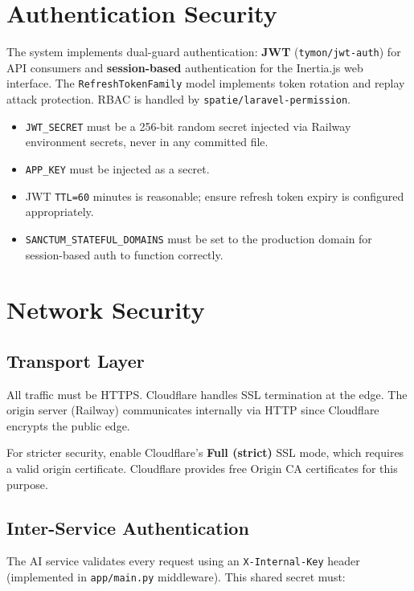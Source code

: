 \documentclass[12pt,a4paper]{report}
\begin{document}
\section{Authentication Security}

The system implements dual-guard authentication:
\textbf{JWT} (\texttt{tymon/jwt-auth}) for API consumers and
\textbf{session-based} authentication for the Inertia.js web
interface. The \texttt{RefreshTokenFamily} model implements token
rotation and replay attack protection. RBAC is handled by
\texttt{spatie/laravel-permission}.

\begin{itemize}[leftmargin=1.5em]
    \item \texttt{JWT\_SECRET} must be a 256-bit random secret injected
          via Railway environment secrets, never in any committed file.
    \item \texttt{APP\_KEY} must be injected as a secret.
    \item JWT \texttt{TTL=60} minutes is reasonable; ensure refresh
          token expiry is configured appropriately.
    \item \texttt{SANCTUM\_STATEFUL\_DOMAINS} must be set to the
          production domain for session-based auth to function correctly.
\end{itemize}

\section{Network Security}

\subsection{Transport Layer}

All traffic must be HTTPS. Cloudflare handles SSL termination at the
edge. The origin server (Railway) communicates internally via HTTP
since Cloudflare encrypts the public edge.

For stricter security, enable Cloudflare's \textbf{Full (strict)} SSL
mode, which requires a valid origin certificate. Cloudflare provides
free Origin CA certificates for this purpose.

\subsection{Inter-Service Authentication}

The AI service validates every request using an \texttt{X-Internal-Key}
header (implemented in \texttt{app/main.py} middleware). This shared
secret must:
\end{document}
